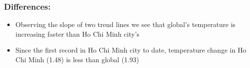 \documentclass[11pt]{article}
\providecommand{\tightlist}{%
      \setlength{\itemsep}{0pt}\setlength{\parskip}{0pt}}
\begin{document}
\subsubsection{Differences:}\label{differences}

\begin{itemize}
\tightlist
\item
  Observing the slope of two trend lines we see that global's
  temperature is increasing faster than Ho Chi Minh city's
\item
  Since the first record in Ho Chi Minh city to date, temperature change
  in Ho Chi Minh (1.48) is less than global (1.93)
\end{itemize}


    
    
    
    
\end{document}
